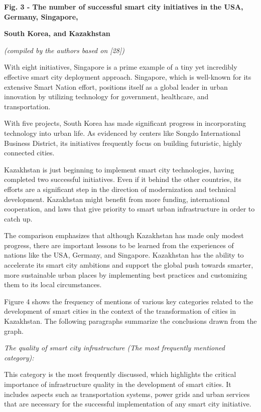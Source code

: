 {\bfseries Fig. 3 - The number of successful smart city initiatives in the
USA, Germany, Singapore,}

{\bfseries South Korea, and Kazakhstan}

\emph{(compiled by the authors based on {[}28{]})}

With eight initiatives, Singapore is a prime example of a tiny yet
incredibly effective smart city deployment approach. Singapore, which is
well-known for its extensive Smart Nation effort, positions itself as a
global leader in urban innovation by utilizing technology for
government, healthcare, and transportation.

With five projects, South Korea has made significant progress in
incorporating technology into urban life. As evidenced by centers like
Songdo International Business District, its initiatives frequently focus
on building futuristic, highly connected cities.

Kazakhstan is just beginning to implement smart city technologies,
having completed two successful initiatives. Even if it behind the other
countries, its efforts are a significant step in the direction of
modernization and technical development. Kazakhstan might benefit from
more funding, international cooperation, and laws that give priority to
smart urban infrastructure in order to catch up.

The comparison emphasizes that although Kazakhstan has made only modest
progress, there are important lessons to be learned from the experiences
of nations like the USA, Germany, and Singapore. Kazakhstan has the
ability to accelerate its smart city ambitions and support the global
push towards smarter, more sustainable urban places by implementing best
practices and customizing them to its local circumstances.

Figure 4 shows the frequency of mentions of various key categories
related to the development of smart cities in the context of the
transformation of cities in Kazakhstan. The following paragraphs
summarize the conclusions drawn from the graph.

\emph{The quality of smart city infrastructure (The most frequently
mentioned category):}

This category is the most frequently discussed, which highlights the
critical importance of infrastructure quality in the development of
smart cities. It includes aspects such as transportation systems, power
grids and urban services that are necessary for the successful
implementation of any smart city initiative.

